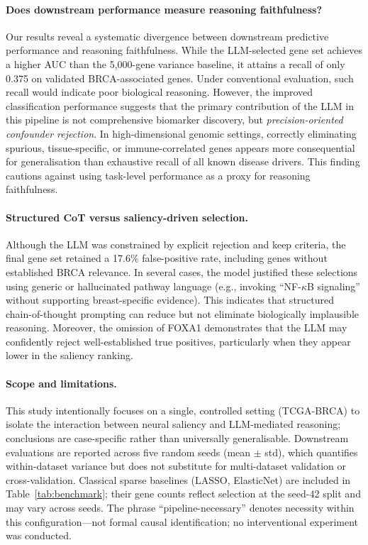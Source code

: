 \documentclass{article}
\begin{document}
\paragraph{Does downstream performance measure reasoning faithfulness?}
Our results reveal a systematic divergence between downstream predictive
performance and reasoning faithfulness.
While the LLM-selected gene set achieves a higher AUC than the 5,000-gene
variance baseline, it attains a recall of only 0.375 on validated
BRCA-associated genes.
Under conventional evaluation, such recall would indicate poor biological
reasoning.
However, the improved classification performance suggests that the primary
contribution of the LLM in this pipeline is not comprehensive biomarker
discovery, but \emph{precision-oriented confounder rejection}.
In high-dimensional genomic settings, correctly eliminating spurious,
tissue-specific, or immune-correlated genes appears more consequential for
generalisation than exhaustive recall of all known disease drivers.
This finding cautions against using task-level performance as a proxy for
reasoning faithfulness.

\paragraph{Structured CoT versus saliency-driven selection.}
Although the LLM was constrained by explicit rejection and keep criteria,
the final gene set retained a 17.6\% false-positive rate, including genes
without established BRCA relevance.
In several cases, the model justified these selections using generic or
hallucinated pathway language (e.g., invoking ``NF-$\kappa$B signaling''
without supporting breast-specific evidence).
This indicates that structured chain-of-thought prompting can reduce but
not eliminate biologically implausible reasoning.
Moreover, the omission of FOXA1 demonstrates that the LLM may confidently
reject well-established true positives, particularly when they appear
lower in the saliency ranking.

\paragraph{Scope and limitations.}
This study intentionally focuses on a single, controlled setting
(TCGA-BRCA) to isolate the interaction between neural saliency and
LLM-mediated reasoning; conclusions are case-specific rather than
universally generalisable.
Downstream evaluations are reported across five random seeds
(mean $\pm$ std), which quantifies within-dataset variance but does not
substitute for multi-dataset validation or cross-validation.
Classical sparse baselines (LASSO, ElasticNet) are included in
Table~\ref{tab:benchmark}; their gene counts reflect selection at the
seed-42 split and may vary across seeds.
The phrase ``pipeline-necessary'' denotes necessity within
this configuration---not formal causal identification;
no interventional experiment was conducted.
\end{document}
